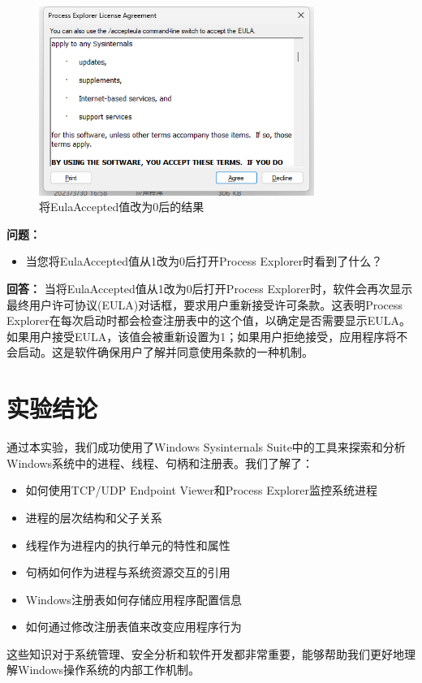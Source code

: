 \documentclass[12pt,a4paper]{article}
\begin{document}
\begin{figure}[H]
    \centering
    \includegraphics[width=0.8\textwidth]{Eula_0_result.png}
    \caption{将EulaAccepted值改为0后的结果}
    \label{fig:eula_result}
\end{figure}

\textbf{问题：}
\begin{itemize}
    \item 当您将EulaAccepted值从1改为0后打开Process Explorer时看到了什么？
\end{itemize}

\textbf{回答：}
当将EulaAccepted值从1改为0后打开Process Explorer时，软件会再次显示最终用户许可协议(EULA)对话框，要求用户重新接受许可条款。这表明Process Explorer在每次启动时都会检查注册表中的这个值，以确定是否需要显示EULA。如果用户接受EULA，该值会被重新设置为1；如果用户拒绝接受，应用程序将不会启动。这是软件确保用户了解并同意使用条款的一种机制。

\section{实验结论}

通过本实验，我们成功使用了Windows Sysinternals Suite中的工具来探索和分析Windows系统中的进程、线程、句柄和注册表。我们了解了：

\begin{itemize}
    \item 如何使用TCP/UDP Endpoint Viewer和Process Explorer监控系统进程
    \item 进程的层次结构和父子关系
    \item 线程作为进程内的执行单元的特性和属性
    \item 句柄如何作为进程与系统资源交互的引用
    \item Windows注册表如何存储应用程序配置信息
    \item 如何通过修改注册表值来改变应用程序行为
\end{itemize}

这些知识对于系统管理、安全分析和软件开发都非常重要，能够帮助我们更好地理解Windows操作系统的内部工作机制。
\end{document}
